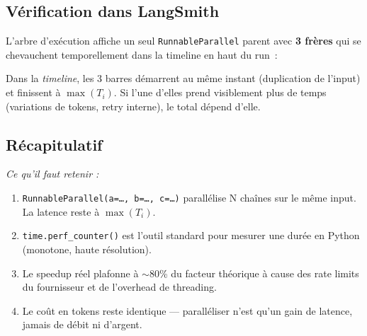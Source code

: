 \documentclass[11pt,a4paper]{article}
\begin{document}
\subsection{Vérification dans LangSmith}

L'arbre d'exécution affiche un seul \texttt{RunnableParallel} parent avec
\textbf{3 frères} qui se chevauchent temporellement dans la timeline en
haut du run~:

\begin{center}
\end{center}

Dans la \emph{timeline}, les 3 barres démarrent au même instant
(duplication de l'input) et finissent à $\max(T_i)$. Si l'une d'elles
prend visiblement plus de temps (variations de tokens, retry interne),
le total dépend d'elle.

\subsection*{Récapitulatif}
{\itshape\sloppy
\textit{Ce qu'il faut retenir :}
\begin{enumerate}[leftmargin=*]
  \item \texttt{RunnableParallel(a=\dots, b=\dots, c=\dots)} parallélise
        N chaînes sur le même input. La latence reste à $\max(T_i)$.
  \item \texttt{time.perf\_counter()} est l'outil standard pour mesurer
        une durée en Python (monotone, haute résolution).
  \item Le speedup réel plafonne à $\sim$80\% du facteur théorique à cause
        des rate limits du fournisseur et de l'overhead de threading.
  \item Le coût en tokens reste identique — paralléliser n'est qu'un gain
        de latence, jamais de débit ni d'argent.
\end{enumerate}
\par}

\end{document}
